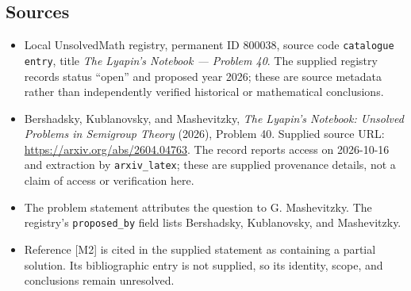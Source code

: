 \documentclass[11pt]{article}
\begin{document}
\subsection{Sources}
\begin{itemize}
\item Local UnsolvedMath registry, permanent ID \(800038\), source code \texttt{catalogue entry}, title \emph{The Lyapin's Notebook --- Problem 40}. The supplied registry records status ``open'' and proposed year 2026; these are source metadata rather than independently verified historical or mathematical conclusions.
\item Bershadsky, Kublanovsky, and Mashevitzky, \emph{The Lyapin's Notebook: Unsolved Problems in Semigroup Theory} (2026), Problem 40. Supplied source URL: \url{https://arxiv.org/abs/2604.04763}. The record reports access on 2026-10-16 and extraction by \texttt{arxiv\_latex}; these are supplied provenance details, not a claim of access or verification here.
\item The problem statement attributes the question to G. Mashevitzky. The registry's \texttt{proposed\_by} field lists Bershadsky, Kublanovsky, and Mashevitzky.
\item Reference [M2] is cited in the supplied statement as containing a partial solution. Its bibliographic entry is not supplied, so its identity, scope, and conclusions remain unresolved.
\end{itemize}
\end{document}

